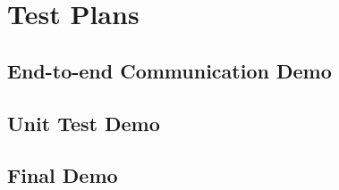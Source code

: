 \section{Test Plans}

\subsection{End-to-end Communication Demo}

\subsection{Unit Test Demo}

\subsection{Final Demo}
